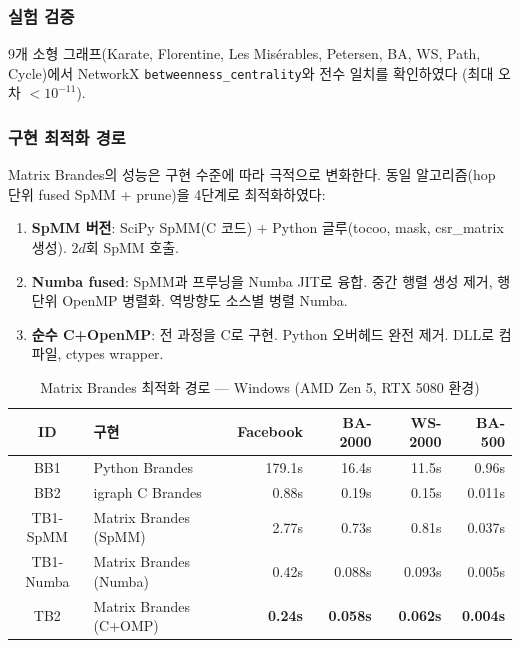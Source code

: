 \documentclass[11pt,a4paper]{article}
\begin{document}
\subsubsection{실험 검증}

9개 소형 그래프(Karate, Florentine, Les Misérables, Petersen, BA, WS, Path, Cycle)에서 NetworkX \texttt{betweenness\_centrality}와 전수 일치를 확인하였다 (최대 오차 $< 10^{-11}$).

\subsubsection{구현 최적화 경로}

Matrix Brandes의 성능은 구현 수준에 따라 극적으로 변화한다. 동일 알고리즘(hop 단위 fused SpMM + prune)을 4단계로 최적화하였다:

\begin{enumerate}[leftmargin=1.4em]
  \item \textbf{SpMM 버전}: SciPy SpMM(C 코드) + Python 글루(tocoo, mask, csr\_matrix 생성). $2d$회 SpMM 호출.
  \item \textbf{Numba fused}: SpMM과 프루닝을 Numba JIT로 융합. 중간 행렬 생성 제거, 행 단위 OpenMP 병렬화. 역방향도 소스별 병렬 Numba.
  \item \textbf{순수 C+OpenMP}: 전 과정을 C로 구현. Python 오버헤드 완전 제거. DLL로 컴파일, ctypes wrapper.
\end{enumerate}

\begin{table}[H]\centering
\caption{Matrix Brandes 최적화 경로 --- Windows (AMD Zen 5, RTX 5080 환경)}
\label{tab:brandes-opt}
\small
\begin{tabular}{@{}clrrrr@{}}
\toprule
\textbf{ID} & \textbf{구현} & \textbf{Facebook} & \textbf{BA-2000} & \textbf{WS-2000} & \textbf{BA-500} \\
\midrule
BB1 & Python Brandes & 179.1s & 16.4s & 11.5s & 0.96s \\
BB2 & igraph C Brandes & 0.88s & 0.19s & 0.15s & 0.011s \\
\midrule
TB1-SpMM & Matrix Brandes (SpMM) & 2.77s & 0.73s & 0.81s & 0.037s \\
TB1-Numba & Matrix Brandes (Numba) & 0.42s & 0.088s & 0.093s & 0.005s \\
\rowcolor{cpubest!8} TB2 & Matrix Brandes (C+OMP) & \textbf{0.24s} & \textbf{0.058s} & \textbf{0.062s} & \textbf{0.004s} \\
\bottomrule
\end{tabular}
\end{table}
\end{document}

